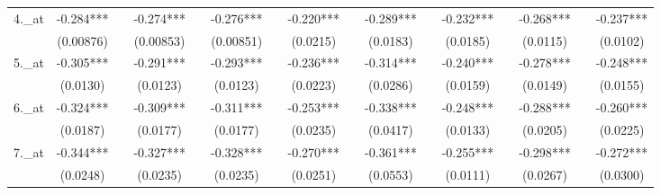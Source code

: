 \documentclass[a4paper, 12pt]{article}
\begin{document}
\begin{table}[H]
\begin{adjustbox}{max width=\textwidth}
\begin{tabular}{llllllllllllllll}
    4.\_at & \multicolumn{1}{c}{-0.284***} &       & \multicolumn{1}{c}{-0.274***} &       & \multicolumn{1}{c}{-0.276***} &       & \multicolumn{1}{c}{-0.220***} &       & \multicolumn{1}{c}{-0.289***} &       & \multicolumn{1}{c}{-0.232***} &       & \multicolumn{1}{c}{-0.268***} &       & \multicolumn{1}{c}{-0.237***} \\
          & \multicolumn{1}{c}{(0.00876)} &       & \multicolumn{1}{c}{(0.00853)} &       & \multicolumn{1}{c}{(0.00851)} &       & \multicolumn{1}{c}{(0.0215)} &       & \multicolumn{1}{c}{(0.0183)} &       & \multicolumn{1}{c}{(0.0185)} &       & \multicolumn{1}{c}{(0.0115)} &       & \multicolumn{1}{c}{(0.0102)} \\
    5.\_at & \multicolumn{1}{c}{-0.305***} &       & \multicolumn{1}{c}{-0.291***} &       & \multicolumn{1}{c}{-0.293***} &       & \multicolumn{1}{c}{-0.236***} &       & \multicolumn{1}{c}{-0.314***} &       & \multicolumn{1}{c}{-0.240***} &       & \multicolumn{1}{c}{-0.278***} &       & \multicolumn{1}{c}{-0.248***} \\
          & \multicolumn{1}{c}{(0.0130)} &       & \multicolumn{1}{c}{(0.0123)} &       & \multicolumn{1}{c}{(0.0123)} &       & \multicolumn{1}{c}{(0.0223)} &       & \multicolumn{1}{c}{(0.0286)} &       & \multicolumn{1}{c}{(0.0159)} &       & \multicolumn{1}{c}{(0.0149)} &       & \multicolumn{1}{c}{(0.0155)} \\
    6.\_at & \multicolumn{1}{c}{-0.324***} &       & \multicolumn{1}{c}{-0.309***} &       & \multicolumn{1}{c}{-0.311***} &       & \multicolumn{1}{c}{-0.253***} &       & \multicolumn{1}{c}{-0.338***} &       & \multicolumn{1}{c}{-0.248***} &       & \multicolumn{1}{c}{-0.288***} &       & \multicolumn{1}{c}{-0.260***} \\
          & \multicolumn{1}{c}{(0.0187)} &       & \multicolumn{1}{c}{(0.0177)} &       & \multicolumn{1}{c}{(0.0177)} &       & \multicolumn{1}{c}{(0.0235)} &       & \multicolumn{1}{c}{(0.0417)} &       & \multicolumn{1}{c}{(0.0133)} &       & \multicolumn{1}{c}{(0.0205)} &       & \multicolumn{1}{c}{(0.0225)} \\
    7.\_at & \multicolumn{1}{c}{-0.344***} &       & \multicolumn{1}{c}{-0.327***} &       & \multicolumn{1}{c}{-0.328***} &       & \multicolumn{1}{c}{-0.270***} &       & \multicolumn{1}{c}{-0.361***} &       & \multicolumn{1}{c}{-0.255***} &       & \multicolumn{1}{c}{-0.298***} &       & \multicolumn{1}{c}{-0.272***} \\
          & \multicolumn{1}{c}{(0.0248)} &       & \multicolumn{1}{c}{(0.0235)} &       & \multicolumn{1}{c}{(0.0235)} &       & \multicolumn{1}{c}{(0.0251)} &       & \multicolumn{1}{c}{(0.0553)} &       & \multicolumn{1}{c}{(0.0111)} &       & \multicolumn{1}{c}{(0.0267)} &       & \multicolumn{1}{c}{(0.0300)} \\

\end{tabular}
\end{adjustbox}
\end{table}
\end{document}
